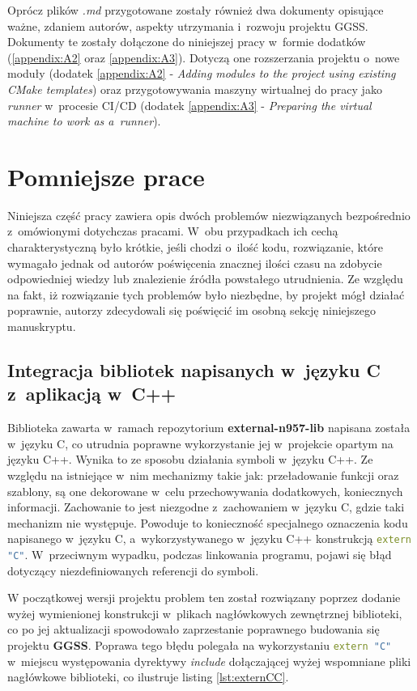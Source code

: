 Oprócz plików \textit{.md} przygotowane zostały również dwa dokumenty opisujące ważne, zdaniem autorów, aspekty utrzymania i~rozwoju projektu GGSS. Dokumenty te zostały dołączone do niniejszej pracy w~formie dodatków (\ref{appendix:A2} oraz \ref{appendix:A3}). Dotyczą one rozszerzania projektu o~nowe moduły (dodatek \ref{appendix:A2} - \textit{Adding modules to the project using existing CMake
templates}) oraz przygotowywania maszyny wirtualnej do pracy jako \textit{runner} w~procesie CI/CD (dodatek \ref{appendix:A3} - \textit{Preparing the virtual machine to work as a~runner}). 

\newpage
\section{Pomniejsze prace}
Niniejsza część pracy zawiera opis dwóch problemów niezwiązanych bezpośrednio z~omówionymi dotychczas pracami. W~obu przypadkach ich cechą charakterystyczną było krótkie, jeśli chodzi o~ilość kodu, rozwiązanie, które wymagało jednak od autorów poświęcenia znacznej ilości czasu na zdobycie odpowiedniej wiedzy lub znalezienie źródła powstałego utrudnienia. Ze względu na fakt, iż rozwiązanie tych problemów było niezbędne, by projekt mógł działać poprawnie, autorzy zdecydowali się poświęcić im osobną sekcję niniejszego manuskryptu.

\subsection{Integracja bibliotek napisanych w~języku C z~aplikacją w~C++}
Biblioteka zawarta w~ramach repozytorium \textbf{external-n957-lib} napisana została w~języku C, co utrudnia poprawne wykorzystanie jej w~projekcie opartym na języku C++. Wynika to ze sposobu działania symboli w~języku C++. Ze względu na istniejące w~nim mechanizmy takie jak: przeładowanie funkcji oraz szablony, są one dekorowane w~celu przechowywania dodatkowych, koniecznych informacji. Zachowanie to jest niezgodne z~zachowaniem w~języku C, gdzie taki mechanizm nie występuje. Powoduje to konieczność specjalnego oznaczenia kodu napisanego w~języku C, a~wykorzystywanego w~języku C++ konstrukcją \lstinline[language=c++]{extern "C"}. W~przeciwnym wypadku, podczas linkowania programu, pojawi się błąd dotyczący niezdefiniowanych referencji do symboli.

W początkowej wersji projektu problem ten został rozwiązany poprzez dodanie wyżej wymienionej konstrukcji w~plikach nagłówkowych zewnętrznej biblioteki, co po jej aktualizacji spowodowało zaprzestanie poprawnego budowania się projektu \textbf{GGSS}. Poprawa tego błędu polegała na wykorzystaniu \lstinline[language=c++]{extern "C"} w~miejscu występowania dyrektywy \textit{include} dołączającej wyżej wspomniane pliki nagłówkowe biblioteki, co ilustruje listing \ref{lst:externCC}.

